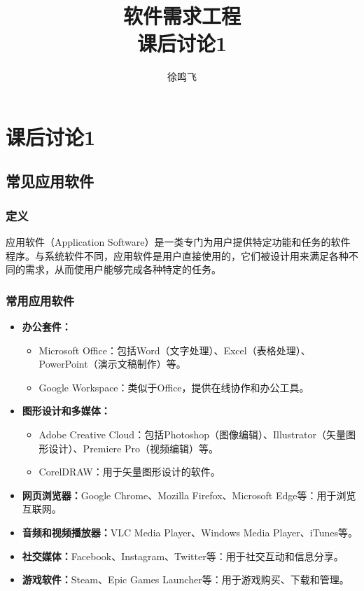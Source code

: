 \documentclass[11pt, a4paper, oneside]{ctexbook}
\title{{\Huge{\textbf{软件需求工程}}}\\课后讨论1}
\author{徐鸣飞}
\date{}
\begin{document}
\maketitle
{}
\setcounter{page}{1}
\newpage
{}
\setcounter{page}{1}
\tableofcontents
\newpage
\setcounter{page}{1}

\chapter{课后讨论1}
\section{常见应用软件}
\subsection{定义}
应用软件（Application Software）是一类专门为用户提供特定功能和任务的软件程序。与系统软件不同，应用软件是用户直接使用的，它们被设计用来满足各种不同的需求，从而使用户能够完成各种特定的任务。
\subsection{常用应用软件}
\begin{itemize}
    \item \textbf{办公套件：}
    \begin{itemize}
        \item Microsoft Office：包括Word（文字处理）、Excel（表格处理）、PowerPoint（演示文稿制作）等。
        \item Google Workspace：类似于Office，提供在线协作和办公工具。
    \end{itemize}
    \item \textbf{图形设计和多媒体：}
    \begin{itemize}
        \item Adobe Creative Cloud：包括Photoshop（图像编辑）、Illustrator（矢量图形设计）、Premiere Pro（视频编辑）等。
        \item CorelDRAW：用于矢量图形设计的软件。
    \end{itemize}
    \item \textbf{网页浏览器：}Google Chrome、Mozilla Firefox、Microsoft Edge等：用于浏览互联网。
    \item \textbf{音频和视频播放器：}VLC Media Player、Windows Media Player、iTunes等。
    \item \textbf{社交媒体：}Facebook、Instagram、Twitter等：用于社交互动和信息分享。
    \item \textbf{游戏软件：}Steam、Epic Games Launcher等：用于游戏购买、下载和管理。
\end{itemize}
\end{document}
